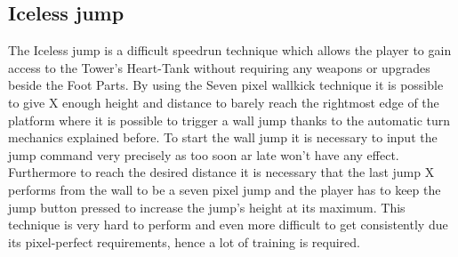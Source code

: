 \subsection{Iceless jump}\label{misc:iceless}
The Iceless jump is a difficult speedrun technique which allows the player to gain access to the Tower's Heart-Tank without requiring any weapons or upgrades beside the Foot Parts. By using the Seven pixel wallkick technique it is possible to give X enough height and distance to barely reach the rightmost edge of the platform where it is possible to trigger a wall jump thanks to the automatic turn mechanics explained before. To start the wall jump it is necessary to input the jump command very precisely as too soon ar late won't have any effect. Furthermore to reach the desired distance it is necessary that the last jump X performs from the wall to be a seven pixel jump and the player has to keep the jump button pressed to increase the jump's height at its maximum. 
This technique is very hard to perform and even more difficult to get consistently due its pixel-perfect requirements, hence a lot of training is required.


